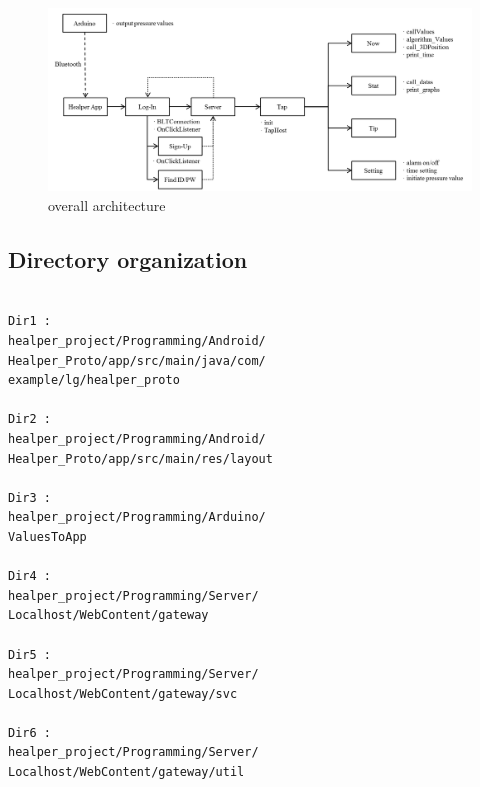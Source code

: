 \documentclass[conference]{IEEEtran}
\begin{document}
\begin{figure}[H]
\begin{center}
    \includegraphics[scale=0.24]{img_16}
    \caption{overall architecture} 
\end{center}
\end{figure}

\subsection{Directory organization}

\begin{verbatim}

Dir1 : 
healper_project/Programming/Android/
Healper_Proto/app/src/main/java/com/
example/lg/healper_proto

Dir2 : 
healper_project/Programming/Android/
Healper_Proto/app/src/main/res/layout

Dir3 : 
healper_project/Programming/Arduino/
ValuesToApp

Dir4 : 
healper_project/Programming/Server/
Localhost/WebContent/gateway

Dir5 : 
healper_project/Programming/Server/
Localhost/WebContent/gateway/svc

Dir6 : 
healper_project/Programming/Server/
Localhost/WebContent/gateway/util

\end{verbatim}
\end{document}
